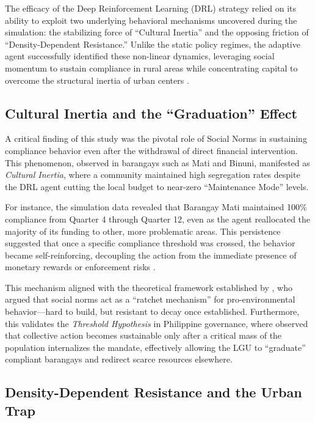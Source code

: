 The efficacy of the Deep Reinforcement Learning (DRL) strategy relied on its ability to exploit two underlying behavioral mechanisms uncovered during the simulation: the stabilizing force of ``Cultural Inertia'' and the opposing friction of ``Density-Dependent Resistance.'' Unlike the static policy regimes, the adaptive agent successfully identified these non-linear dynamics, leveraging social momentum to sustain compliance in rural areas while concentrating capital to overcome the structural inertia of urban centers \citep{Jimenez2025}.

\subsection{Cultural Inertia and the ``Graduation'' Effect}

A critical finding of this study was the pivotal role of Social Norms in sustaining compliance behavior even after the withdrawal of direct financial intervention. This phenomenon, observed in barangays such as Mati and Binuni, manifested as \textit{Cultural Inertia}, where a community maintained high segregation rates despite the DRL agent cutting the local budget to near-zero ``Maintenance Mode'' levels. 

For instance, the simulation data revealed that Barangay Mati maintained 100\% compliance from Quarter 4 through Quarter 12, even as the agent reallocated the majority of its funding to other, more problematic areas. This persistence suggested that once a specific compliance threshold was crossed, the behavior became self-reinforcing, decoupling the action from the immediate presence of monetary rewards or enforcement risks \citep{Corcoran2020}.

This mechanism aligned with the theoretical framework established by \citet{Andre2021}, who argued that social norms act as a ``ratchet mechanism'' for pro-environmental behavior—hard to build, but resistant to decay once established. Furthermore, this validates the \textit{Threshold Hypothesis} in Philippine governance, where \citet{Nishimura2022} observed that collective action becomes sustainable only after a critical mass of the population internalizes the mandate, effectively allowing the LGU to ``graduate'' compliant barangays and redirect scarce resources elsewhere.

\subsection{Density-Dependent Resistance and the Urban Trap}


